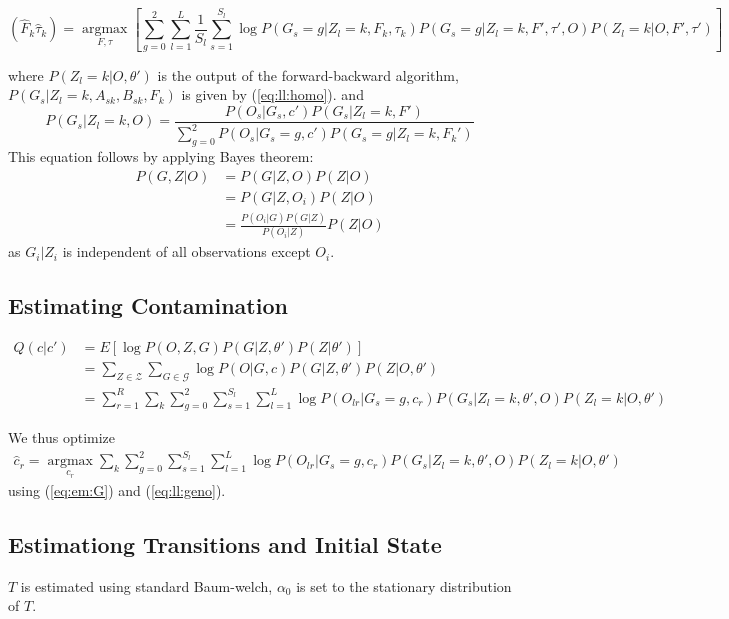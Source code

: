 \documentclass[10pt,a4paper]{article}
\begin{document}
\begin{equation}
(\hat{F}_k \hat{\tau}_k) =\operatorname*{argmax}_{F, \tau} \left[ \sum_{g=0}^2\sum_{l=1}^L\frac{1}{S_l}\sum_{s=1}^{S_l} \log P(G_s=g | Z_l=k, F_k, \tau_k)  P(G_s=g| Z_l=k, F', \tau', O) P(Z_l=k | O, F', \tau') 
\right]\label{eq:opt:F}
\end{equation}

where $P(Z_l = k |O, \theta')$ is the output of the forward-backward algorithm, $P(G_s | Z_l=k, A_{sk}, B_{sk}, F_k)$ is given by (\ref{eq:ll:homo}).   and
\begin{equation}
P(G_s | Z_l=k, O) = \frac{P(O_s | G_s, c') P(G_s | Z_l=k, F')}{ \sum_{g=0}^2 P(O_s | G_s=g, c') P(G_s=g | Z_l=k, F_k') }
\label{eq:em:G}
\end{equation}
This equation follows by applying Bayes theorem: 
\begin{align}
P(G,Z| O) &= P(G|Z, O)P(Z|O)\nonumber\\
&=P(G | Z, O_i) P(Z | O)\nonumber\\
&= \frac{P(O_i | G) P(G|Z)}{P(O_i | Z)} P(Z|O)
\end{align}
as $G_i | Z_i$ is independent of all observations except $O_i$.




\subsection{Estimating Contamination}
\begin{align}
Q(c|c' )&= E[\log P(O, Z, G )  P(G|Z, \theta') P(Z | \theta')]\nonumber\\
&=\sum_{Z \in \mathcal{Z}}\sum_{G \in \mathcal{G}} \log P( O | G, c) P(G|Z, \theta') P(Z | O, \theta')\nonumber\\
&=\sum_{r=1}^R\sum_k\sum_{g=0}^2 \sum_{s=1}^{S_l}\sum_{l=1}^L \log P(O_{lr} | G_s=g, c_r)  P(G_s|Z_l=k, \theta', O) P(Z_l=k | O, \theta')
\end{align}

We thus optimize
\begin{align}
\hat{c}_r = \operatorname*{argmax}_{c_r}\sum_k\sum_{g=0}^2 \sum_{s=1}^{S_l}\sum_{l=1}^L \log P(O_{lr} | G_s=g, c_r)  P(G_s|Z_l=k, \theta', O) P(Z_l=k | O, \theta')
\end{align}
using (\ref{eq:em:G}) and (\ref{eq:ll:geno}).
\subsection{Estimationg Transitions and Initial State}
$T$ is estimated using standard Baum-welch, $\alpha_0$ is set to the stationary distribution of $T$.
\end{document}

